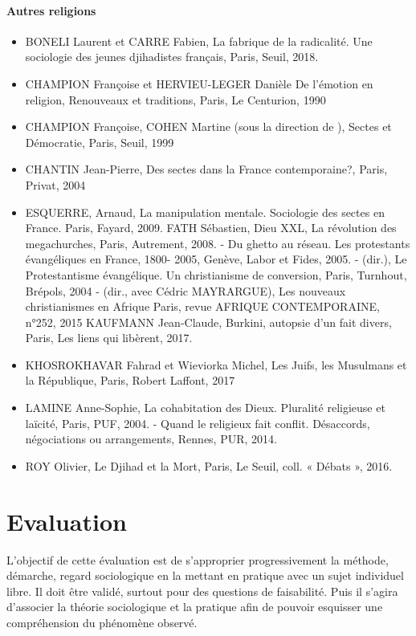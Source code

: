 \paragraph{Autres religions}
\begin{itemize}
  \item BONELI Laurent et CARRE Fabien, La fabrique de la radicalité. Une sociologie des jeunes  djihadistes français, Paris, Seuil, 2018. \item 
  CHAMPION Françoise et HERVIEU-LEGER Danièle De l’émotion en religion,  Renouveaux et traditions, Paris, Le Centurion, 1990 
  \item CHAMPION Françoise, COHEN Martine (sous la direction de ), Sectes et Démocratie,  Paris, Seuil, 1999 
\item  CHANTIN Jean-Pierre, Des sectes dans la France contemporaine?, Paris, Privat, 2004 
\item ESQUERRE, Arnaud, La manipulation mentale. Sociologie des sectes en France.  Paris, Fayard, 2009. FATH Sébastien, Dieu XXL, La révolution des megachurches, Paris, Autrement, 2008. - Du ghetto au réseau. Les protestants évangéliques en France, 1800- 2005, Genève, Labor et Fides, 2005. -  (dir.), Le Protestantisme évangélique. Un christianisme de conversion,  Paris, Turnhout, Brépols, 2004 - (dir., avec Cédric MAYRARGUE), Les nouveaux christianismes en Afrique Paris, revue AFRIQUE CONTEMPORAINE, n°252, 2015 KAUFMANN Jean-Claude, Burkini, autopsie d'un fait divers, Paris, Les liens qui libèrent,  2017. 
\item KHOSROKHAVAR Fahrad et Wieviorka Michel, Les Juifs, les Musulmans et la République,  Paris, Robert Laffont, 2017 
 \item LAMINE Anne-Sophie, La cohabitation des Dieux. Pluralité religieuse et laïcité, Paris,  PUF, 2004.  - Quand le religieux fait conflit. Désaccords, négociations ou arrangements, Rennes, PUR, 2014. 
\item ROY Olivier, Le Djihad et la Mort, Paris, Le Seuil, coll. « Débats », 2016.  
\end{itemize}



\section{Evaluation}

L’objectif de cette évaluation est de s’approprier progressivement la méthode, démarche, regard
sociologique en la mettant en pratique avec un sujet individuel libre. Il doit être validé, surtout pour
des questions de faisabilité. Puis il s’agira d’associer la théorie sociologique et la pratique afin de
pouvoir esquisser une compréhension du phénomène observé.

